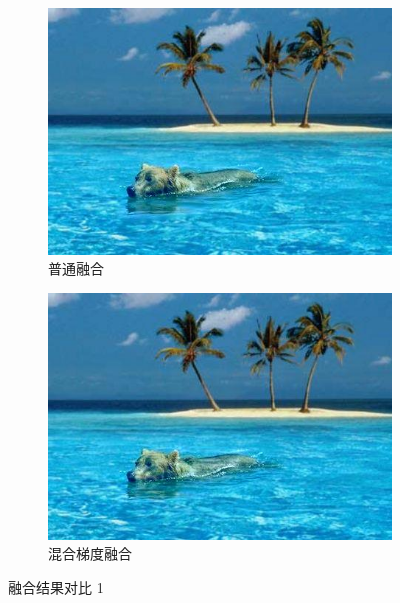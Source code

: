 \documentclass[11pt,a4paper]{article}
\begin{document}
		\begin{figure}[ht]
			\centering
			\begin{subfigure}[htbp]{0.36\textwidth}
				\includegraphics[width=\textwidth]{../../result/result_00.jpg}
				\caption{普通融合}
			\end{subfigure}
			\begin{subfigure}[htbp]{0.36\textwidth}
				\includegraphics[width=\textwidth]{../../result/result_01.jpg}
				\caption{混合梯度融合}
			\end{subfigure}
			\caption{融合结果对比 1}
		\end{figure}
\end{document}
